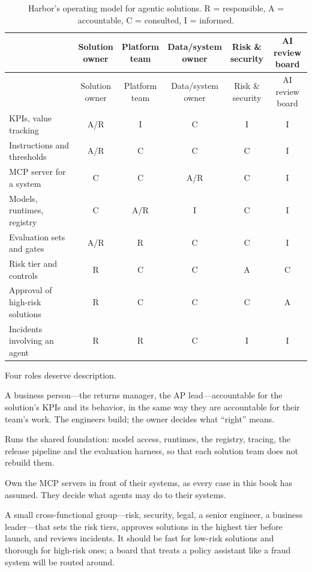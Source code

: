 \begingroup
\small
\begin{longtable}{@{}lccccc@{}}
\caption{Harbor's operating model for agentic solutions. R = responsible, A = accountable, C = consulted, I = informed.}\label{tab:cap-raci}\\
\toprule
\rowcolor{coHead} & \shortstack{Solution\\owner} & \shortstack{Platform\\team} & \shortstack{Data/system\\owner} & \shortstack{Risk \&\\security} & \shortstack{AI review\\board} \\
\midrule
\endfirsthead
\toprule
\rowcolor{coHead} & \shortstack{Solution\\owner} & \shortstack{Platform\\team} & \shortstack{Data/system\\owner} & \shortstack{Risk \&\\security} & \shortstack{AI review\\board} \\
\midrule
\endhead
KPIs, value tracking & A/R & I & C & I & I \\
Instructions and thresholds & A/R & C & C & C & I \\
MCP server for a system & C & C & A/R & C & I \\
Models, runtimes, registry & C & A/R & I & C & I \\
Evaluation sets and gates & A/R & R & C & C & I \\
Risk tier and controls & R & C & C & A & C \\
Approval of high-risk solutions & R & C & C & C & A \\
Incidents involving an agent & R & R & C & I & I \\
\bottomrule
\end{longtable}
\endgroup

Four roles deserve description.
\begin{description}[leftmargin=1em,itemsep=2pt]
  \item[Solution owner.] A business person---the returns manager, the AP lead---accountable for the solution's KPIs and its behavior, in the same way they are accountable for their team's work. The engineers build; the owner decides what ``right'' means.
  \item[Platform team.] Runs the shared foundation: model access, runtimes, the registry, tracing, the release pipeline and the evaluation harness, so that each solution team does not rebuild them.
  \item[Data and system owners.] Own the MCP servers in front of their systems, as every case in this book has assumed. They decide what agents may do to their systems.
  \item[AI review board.] A small cross-functional group---risk, security, legal, a senior engineer, a business leader---that sets the risk tiers, approves solutions in the highest tier before launch, and reviews incidents. It should be fast for low-risk solutions and thorough for high-risk ones; a board that treats a policy assistant like a fraud system will be routed around.
\end{description}

